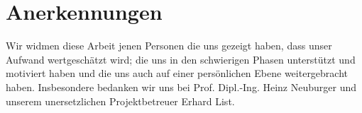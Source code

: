 \section*{Anerkennungen}

Wir widmen diese Arbeit jenen Personen die uns gezeigt haben, dass unser Aufwand wertgeschätzt wird; die uns in den schwierigen Phasen unterstützt und motiviert haben und die uns auch auf einer persönlichen Ebene weitergebracht haben. Insbesondere bedanken wir uns bei Prof. Dipl.-Ing. Heinz Neuburger und unserem unersetzlichen Projektbetreuer Erhard List.